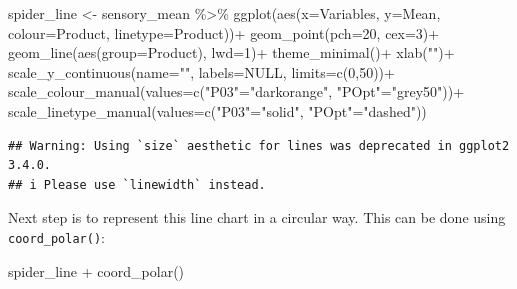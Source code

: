 \documentclass[
]{krantz}
\makeatletter
\newenvironment{Shaded}{\begin{snugshade}}{\end{snugshade}}
\newcommand{\AttributeTok}[1]{\textcolor[rgb]{0.61,0.61,0.61}{#1}}
\newcommand{\ConstantTok}[1]{\textcolor[rgb]{0,0,0}{#1}}
\newcommand{\DecValTok}[1]{\textcolor[rgb]{0.06,0.06,0.06}{#1}}
\newcommand{\FunctionTok}[1]{\textcolor[rgb]{0,0,0}{#1}}
\newcommand{\NormalTok}[1]{#1}
\newcommand{\OtherTok}[1]{\textcolor[rgb]{0.37,0.37,0.37}{#1}}
\newcommand{\SpecialCharTok}[1]{\textcolor[rgb]{0,0,0}{#1}}
\newcommand{\StringTok}[1]{\textcolor[rgb]{0.5,0.5,0.5}{#1}}
\newenvironment{kframe}{%
\medskip{}
\setlength{\fboxsep}{.8em}
 \def\at@end@of@kframe{}%
 \ifinner\ifhmode%
  \def\at@end@of@kframe{\end{minipage}}%
  \begin{minipage}{\columnwidth}%
 \fi\fi%
 \def\FrameCommand##1{\hskip\@totalleftmargin \hskip-\fboxsep
 \colorbox{shadecolor}{##1}\hskip-\fboxsep
     \hskip-\linewidth \hskip-\@totalleftmargin \hskip\columnwidth}%
 \MakeFramed {\advance\hsize-\width
   \@totalleftmargin\z@ \linewidth\hsize
   \@setminipage}}%
 {\par\unskip\endMakeFramed%
 \at@end@of@kframe}
\renewenvironment{Shaded}{\begin{kframe}}{\end{kframe}}
\makeatother
\begin{document}
\begin{Shaded}
\begin{Highlighting}[]
\NormalTok{spider\_line }\OtherTok{\textless{}{-}}\NormalTok{ sensory\_mean }\SpecialCharTok{\%\textgreater{}\%} 
  \FunctionTok{ggplot}\NormalTok{(}\FunctionTok{aes}\NormalTok{(}\AttributeTok{x=}\NormalTok{Variables, }\AttributeTok{y=}\NormalTok{Mean, }\AttributeTok{colour=}\NormalTok{Product, }\AttributeTok{linetype=}\NormalTok{Product))}\SpecialCharTok{+}
  \FunctionTok{geom\_point}\NormalTok{(}\AttributeTok{pch=}\DecValTok{20}\NormalTok{, }\AttributeTok{cex=}\DecValTok{3}\NormalTok{)}\SpecialCharTok{+}
  \FunctionTok{geom\_line}\NormalTok{(}\FunctionTok{aes}\NormalTok{(}\AttributeTok{group=}\NormalTok{Product), }\AttributeTok{lwd=}\DecValTok{1}\NormalTok{)}\SpecialCharTok{+}
  \FunctionTok{theme\_minimal}\NormalTok{()}\SpecialCharTok{+}
  \FunctionTok{xlab}\NormalTok{(}\StringTok{""}\NormalTok{)}\SpecialCharTok{+}
  \FunctionTok{scale\_y\_continuous}\NormalTok{(}\AttributeTok{name=}\StringTok{""}\NormalTok{, }\AttributeTok{labels=}\ConstantTok{NULL}\NormalTok{, }\AttributeTok{limits=}\FunctionTok{c}\NormalTok{(}\DecValTok{0}\NormalTok{,}\DecValTok{50}\NormalTok{))}\SpecialCharTok{+}
  \FunctionTok{scale\_colour\_manual}\NormalTok{(}\AttributeTok{values=}\FunctionTok{c}\NormalTok{(}\StringTok{"P03"}\OtherTok{=}\StringTok{"darkorange"}\NormalTok{, }\StringTok{"POpt"}\OtherTok{=}\StringTok{"grey50"}\NormalTok{))}\SpecialCharTok{+}
  \FunctionTok{scale\_linetype\_manual}\NormalTok{(}\AttributeTok{values=}\FunctionTok{c}\NormalTok{(}\StringTok{"P03"}\OtherTok{=}\StringTok{"solid"}\NormalTok{, }\StringTok{"POpt"}\OtherTok{=}\StringTok{"dashed"}\NormalTok{))}
\end{Highlighting}
\end{Shaded}

\begin{verbatim}
## Warning: Using `size` aesthetic for lines was deprecated in ggplot2 3.4.0.
## i Please use `linewidth` instead.
\end{verbatim}

Next step is to represent this line chart in a circular way. This can be done using \texttt{coord\_polar()}:

\begin{Shaded}
\begin{Highlighting}[]
\NormalTok{spider\_line }\SpecialCharTok{+} \FunctionTok{coord\_polar}\NormalTok{()}
\end{Highlighting}
\end{Shaded}
\end{document}
